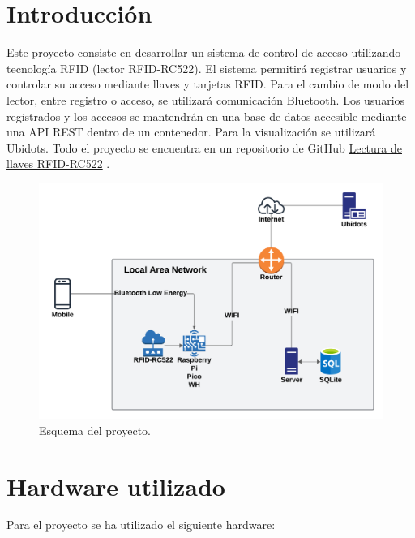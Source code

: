 \documentclass{article}
\begin{document}
\tableofcontents

\newpage


\section{Introducción}

Este proyecto consiste en desarrollar un sistema de control de acceso utilizando tecnología RFID (lector RFID-RC522).
El sistema permitirá registrar usuarios y controlar su acceso mediante llaves y tarjetas RFID. 
Para el cambio de modo del lector, entre registro o acceso, se utilizará comunicación Bluetooth. 
Los usuarios registrados y los accesos se mantendrán en una base de datos accesible mediante una API REST dentro de un contenedor. 
Para la visualización se utilizará Ubidots.
Todo el proyecto se encuentra en un repositorio de GitHub \href{https://github.com/AbelHaro/Lectura-de-llaves-RFID-RC522}{Lectura de llaves RFID-RC522} \cite{abelharo2024lectura}.

\begin{figure}[H]
\centering
\includegraphics[width=0.9\linewidth]{../images/esquema_proyecto.png}
\caption{\label{fig:esquema red}Esquema del proyecto.}
\end{figure}

\section{Hardware utilizado}
Para el proyecto se ha utilizado el siguiente hardware:
\end{document}
